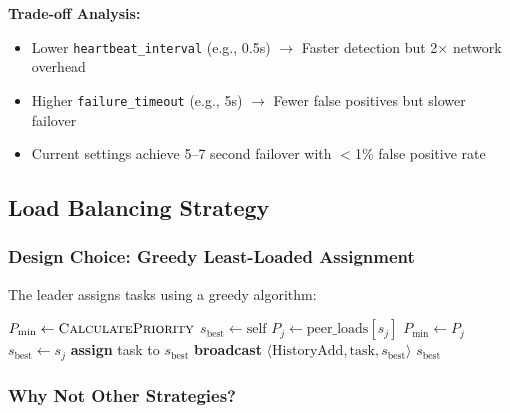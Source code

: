 \documentclass[12pt,a4paper]{article}
\begin{document}
\textbf{Trade-off Analysis:}
\begin{itemize}
    \item Lower \texttt{heartbeat\_interval} (e.g., 0.5s) $\rightarrow$ Faster detection but 2$\times$ network overhead
    \item Higher \texttt{failure\_timeout} (e.g., 5s) $\rightarrow$ Fewer false positives but slower failover
    \item Current settings achieve 5--7 second failover with $<$1\% false positive rate
\end{itemize}

\subsection{Load Balancing Strategy}

\subsubsection{Design Choice: Greedy Least-Loaded Assignment}

The leader assigns tasks using a greedy algorithm:

\begin{algorithm}[h]
\caption{Task Assignment by Leader}
\label{alg:assignment}
\begin{algorithmic}[1]
    \State $P_{\text{min}} \gets \Call{CalculatePriority}{}$ 
    \State $s_{\text{best}} \gets \text{self}$ 
        \State $P_j \gets \text{peer\_loads}[s_j]$ 
            \State $P_{\text{min}} \gets P_j$
            \State $s_{\text{best}} \gets s_j$
        \EndIf
    \EndFor
    \State \textbf{assign} task to $s_{\text{best}}$
    \State \textbf{broadcast} $\langle\text{HistoryAdd}, \text{task}, s_{\text{best}}\rangle$
    \State \Return $s_{\text{best}}$
\EndProcedure
\end{algorithmic}
\end{algorithm}

\subsubsection{Why Not Other Strategies?}
\end{document}
